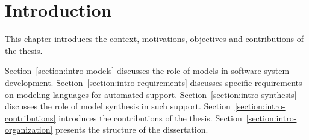 \chapter{Introduction\label{chap:introduction}}

This chapter introduces the context, motivations, objectives and contributions of the thesis.

Section~\ref{section:intro-models} discusses the role of models in software system development. Section~\ref{section:intro-requirements} discusses specific requirements on modeling languages for automated support. Section~\ref{section:intro-synthesis} discusses the role of model synthesis in such support. Section~\ref{section:intro-contributions} introduces the contributions of the thesis. Section~\ref{section:intro-organization} presents the structure of the dissertation.






